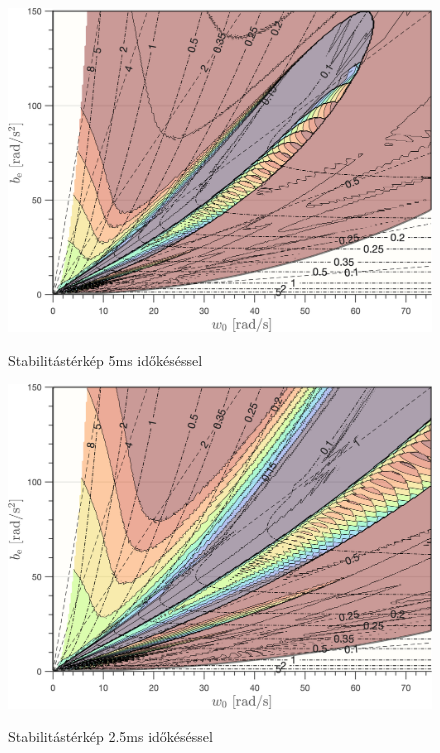 \begin{figure}[p]
    \begin{center}
    \includegraphics[width=14cm]{images/stab_map_0005.png}
    \caption{Stabilitástérkép 5ms időkéséssel}\label{fig:stab_map_0005}
    \includegraphics[width=14cm]{images/stab_map_00025.png}
    \caption{Stabilitástérkép 2.5ms időkéséssel}\label{fig:stab_map_00025}
    \end{center}
\end{figure}

